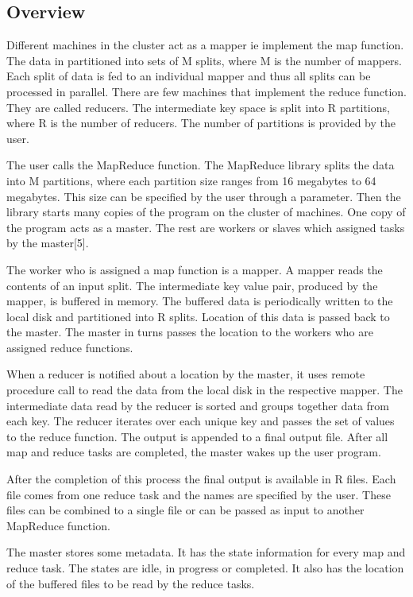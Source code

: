 \documentclass[sigconf]{acmart}
\begin{document}
\subsection{Overview}  
\par Different machines in the cluster act as a mapper ie implement the map function. The data in partitioned into sets of M splits, where M is the number of mappers. Each split of data is fed to an individual mapper and thus all splits can be processed in parallel. There are few machines that implement the reduce function. They are called reducers. The intermediate key space is split into R partitions, where R is the number of reducers. The number of partitions is provided by the user. 

\par The user calls the MapReduce function. The MapReduce library splits the data into M partitions, where each partition size ranges from 16 megabytes to 64 megabytes. This size can be specified by the user through a parameter. Then the library starts many copies of the program on the cluster of machines. One copy of the program acts as a master. The rest are workers or slaves which assigned tasks by the master[5]. 
\par The worker who is assigned a map function is a mapper. A mapper reads the contents of an input split. The intermediate key value pair, produced by the mapper, is buffered in memory. The buffered data is periodically written to the local disk and partitioned into R splits. Location of this data is passed back to the master. The master in turns passes the location to the workers who are assigned reduce functions. 
\par When a reducer is notified about a location by the master, it uses remote procedure call to read the data from the local disk in the respective mapper. The intermediate data read by the reducer is sorted and groups together data from each key. The reducer iterates over each unique key and passes the set of values to the reduce function. The output is appended to a final output file. After all map and reduce tasks are completed, the master wakes up the user program. 
\par After the completion of this process the final output is available in R files. Each file comes from one reduce task and the names are specified by the user.   These files can be combined to a single file or can be passed as input to another MapReduce function. 
\par The master stores some metadata. It has the state information for every map and reduce task. The states are idle, in progress or completed. It also has the location of the buffered files to be read by the reduce tasks. 
\end{document}
